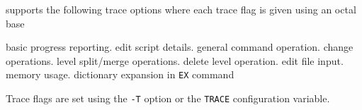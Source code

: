  supports the following trace options where each
trace flag is given using an octal base
\begin{optlist}
    basic progress reporting.
    edit script details.
    general command operation.
    change operations.
    level split/merge operations.
    delete level operation.
    edit file input.
    memory usage.
    dictionary expansion in \texttt{EX} command
\end{optlist}
Trace flags are set using the \texttt{-T} option or the  \texttt{TRACE} 
configuration variable.



